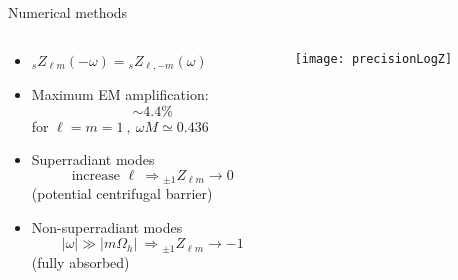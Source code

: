 \documentclass[9pt]{beamer}
\newcommand{\uu}[3][]{ {}_{#1} #2_{#3} }
\begin{document}
\begin{frame}{Numerical methods}
	\begin{columns}
		\begin{column}{0.45\textwidth}
			\begin{itemize}
				\setlength\itemsep{1.5em}
				\item $\uu[s]{Z}{\ell m}(-\omega) = \uu[s]{Z}{\ell, -m}(\omega)$

				\item Maximum EM amplification:
				$$\sim \mathbf{4.4\%}$$
				for $\ell=m=1 ~,~  \omega M \simeq 0.436$

				\item Superradiant modes
				$$ \text{increase } \ell ~\Rightarrow {}_{\pm 1}{Z}_{\ell m} \to 0 $$
				(potential centrifugal barrier)

				\item Non-superradiant modes $$|\omega|\gg|m\Omega_h| ~\Rightarrow {}_{\pm 1}{Z}_{\ell m} \to -1 $$ (fully absorbed)
			\end{itemize}
			\vfill
		\end{column}
		\begin{column}{0.55\textwidth}
			\texttt{[image: precisionLogZ]}
		\end{column}
	\end{columns}
\end{frame}
\end{document}

